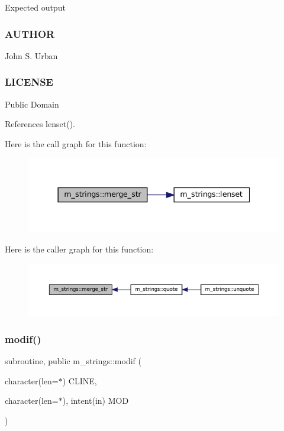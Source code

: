 Expected output \begin{DoxyVerb}
\end{DoxyVerb}
 \subsubsection*{A\+U\+T\+H\+OR}

John S. Urban \subsubsection*{L\+I\+C\+E\+N\+SE}

Public Domain 

References lenset().

Here is the call graph for this function\+:
\nopagebreak
\begin{figure}[H]
\begin{center}
\leavevmode
\includegraphics[width=337pt]{namespacem__strings_aba5a8d7fc092b38d1939f37a13247c1e_cgraph}
\end{center}
\end{figure}
Here is the caller graph for this function\+:
\nopagebreak
\begin{figure}[H]
\begin{center}
\leavevmode
\includegraphics[width=350pt]{namespacem__strings_aba5a8d7fc092b38d1939f37a13247c1e_icgraph}
\end{center}
\end{figure}
\mbox{\label{namespacem__strings_aec887410b018916a683fbb2ae529f8c5}} 
\subsubsection{\texorpdfstring{modif()}{modif()}}
{\footnotesize\ttfamily subroutine, public m\+\_\+strings\+::modif (\begin{DoxyParamCaption}\item[{character(len=$\ast$)}]{C\+L\+I\+NE,  }\item[{character(len=$\ast$), intent(in)}]{M\+OD }\end{DoxyParamCaption})}




